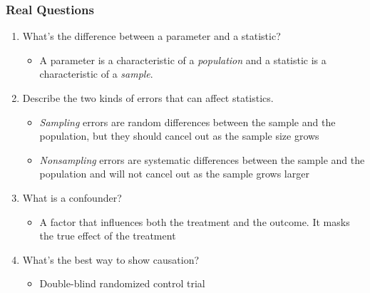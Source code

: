 \documentclass{beamer}
\begin{document}
\begin{frame}
\frametitle{Real Questions}
    \begin{enumerate}[<+- | alert@+>]
        \item What's the difference between a parameter and a statistic?
            \begin{itemize}
                \item A parameter is a characteristic of a \textit{population} and a statistic is a characteristic                      
                of a \textit{sample}.
            \end{itemize}
        \item Describe the two kinds of errors that can affect statistics. 
            \begin{itemize}
                \item \textit{Sampling} errors are random differences between the sample and the 
                population, but they should cancel out as the sample size grows
                \item \textit{Nonsampling} errors are systematic differences between the sample and the 
                population and will not cancel out as the sample grows larger
            \end{itemize}
        \item What is a confounder?
        \begin{itemize}
                \item A factor that influences both the treatment and the outcome. It masks the true 
                effect of the treatment
        \end{itemize}
        \item What's the best way to show causation?
        \begin{itemize}
            \item Double-blind randomized control trial
        \end{itemize}
    \end{enumerate}
\end{frame} 
\end{document}
